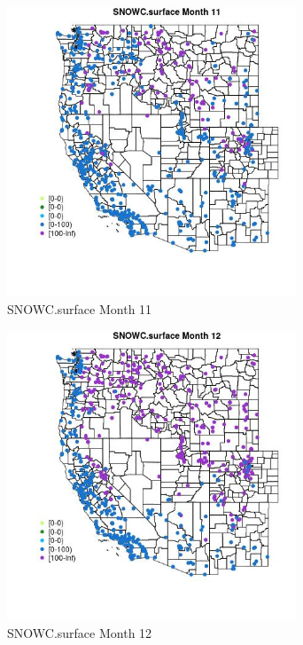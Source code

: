 \begin{figure} 
\centering  
\includegraphics[width=0.77\textwidth]{Code_Outputs/Report_ML_input_PM25_Step4_part_e_de_duplicated_aves_compiled_2019-05-21wNAs_MapObsMo11SNOWCsurface.jpg} 
\caption{\label{fig:Report_ML_input_PM25_Step4_part_e_de_duplicated_aves_compiled_2019-05-21wNAsMapObsMo11SNOWCsurface}SNOWC.surface Month 11} 
\end{figure} 
 

\begin{figure} 
\centering  
\includegraphics[width=0.77\textwidth]{Code_Outputs/Report_ML_input_PM25_Step4_part_e_de_duplicated_aves_compiled_2019-05-21wNAs_MapObsMo12SNOWCsurface.jpg} 
\caption{\label{fig:Report_ML_input_PM25_Step4_part_e_de_duplicated_aves_compiled_2019-05-21wNAsMapObsMo12SNOWCsurface}SNOWC.surface Month 12} 
\end{figure} 
 

